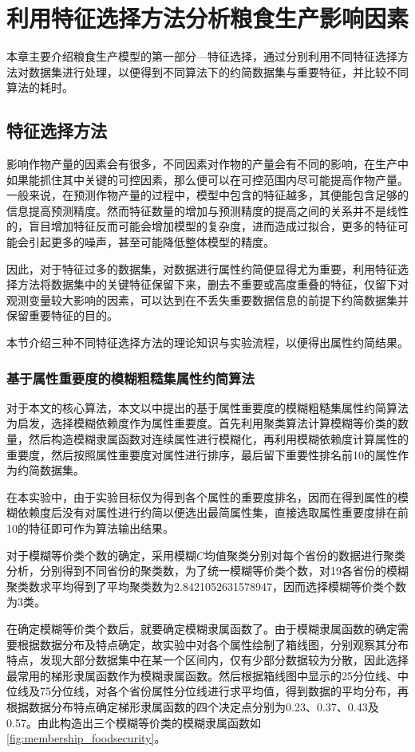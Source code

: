 \chapter{利用特征选择方法分析粮食生产影响因素}
\label{chapter:3}
本章主要介绍粮食生产模型的第一部分—特征选择，通过分别利用不同特征选择方法对数据集进行处理，以便得到不同算法下的约简数据集与重要特征，并比较不同算法的耗时。
\section{特征选择方法}
影响作物产量的因素会有很多，不同因素对作物的产量会有不同的影响，在生产中如果能抓住其中关键的可控因素，那么便可以在可控范围内尽可能提高作物产量。一般来说，在预测作物产量的过程中，模型中包含的特征越多，其便能包含足够的信息提高预测精度。然而特征数量的增加与预测精度的提高之间的关系并不是线性的，盲目增加特征反而可能会增加模型的复杂度，进而造成过拟合，更多的特征可能会引起更多的噪声，甚至可能降低整体模型的精度。

因此，对于特征过多的数据集，对数据进行属性约简便显得尤为重要，利用特征选择方法将数据集中的关键特征保留下来，删去不重要或高度重叠的特征，仅留下对观测变量较大影响的因素，可以达到在不丢失重要数据信息的前提下约简数据集并保留重要特征的目的。

本节介绍三种不同特征选择方法的理论知识与实验流程，以便得出属性约简结果。
\subsection{基于属性重要度的模糊粗糙集属性约简算法}
\label{chapter:基于属性重要度的模糊粗糙集属性约简算法}
对于本文的核心算法，本文以\cite{基于粗糙集和模糊粗糙集的属性约简研究}中提出的基于属性重要度的模糊粗糙集属性约简算法为启发，选择模糊依赖度作为属性重要度。首先利用聚类算法计算模糊等价类的数量，然后构造模糊隶属函数对连续属性进行模糊化，再利用模糊依赖度计算属性的重要度，然后按照属性重要度对属性进行排序，最后留下重要性排名前10的属性作为约简数据集。

在本实验中，由于实验目标仅为得到各个属性的重要度排名，因而在得到属性的模糊依赖度后没有对属性进行约简以便选出最简属性集，直接选取属性重要度排在前10的特征即可作为算法输出结果。

对于模糊等价类个数的确定，采用模糊$C$均值聚类分别对每个省份的数据进行聚类分析，分别得到不同省份的聚类数，为了统一模糊等价类个数，对19各省份的模糊聚类数求平均得到了平均聚类数为2.8421052631578947，因而选择模糊等价类个数为3类。

在确定模糊等价类个数后，就要确定模糊隶属函数了。由于模糊隶属函数的确定需要根据数据分布及特点确定，故实验中对各个属性绘制了箱线图，分别观察其分布特点，发现大部分数据集中在某一个区间内，仅有少部分数据较为分散，因此选择最常用的梯形隶属函数作为模糊隶属函数。然后根据箱线图中显示的25分位线、中位线及75分位线，对各个省份属性分位线进行求平均值，得到数据的平均分布，再根据数据分布特点确定梯形隶属函数的四个决定点分别为0.23、0.37、0.43及0.57。由此构造出三个模糊等价类的模糊隶属函数如\ref{fig:membership_foodsecurity}。

